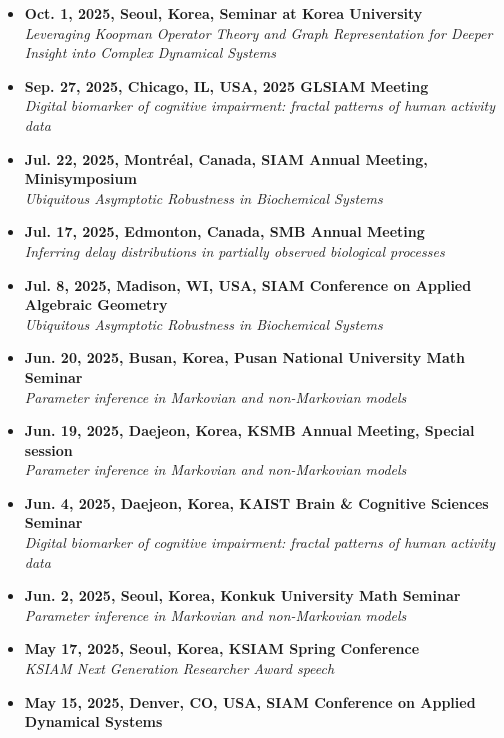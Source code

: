 \documentclass[margin,line]{res}
\begin{document}
\begin{resume}
\begin{itemize}[leftmargin=0pt, label={}]
    \textit{Ubiquitous Asymptotic Robustness in Biochemical Systems}
    \item \textbf{Oct. 1, 2025, Seoul, Korea, Seminar at Korea University} \\
    \textit{Leveraging Koopman Operator Theory and Graph Representation for Deeper Insight into Complex Dynamical Systems}
    \item \textbf{Sep. 27, 2025, Chicago, IL, USA, 2025 GLSIAM Meeting} \\
    \textit{Digital biomarker of cognitive impairment: fractal patterns of human activity data}
    \item \textbf{Jul. 22, 2025, Montréal, Canada, SIAM Annual Meeting, Minisymposium} \\
    \textit{Ubiquitous Asymptotic Robustness in Biochemical Systems}
    \item \textbf{Jul. 17, 2025, Edmonton, Canada, SMB Annual Meeting} \\
    \textit{Inferring delay distributions in partially observed biological processes}
    \item \textbf{Jul. 8, 2025, Madison, WI, USA, SIAM Conference on Applied Algebraic Geometry} \\
    \textit{Ubiquitous Asymptotic Robustness in Biochemical Systems}
    \item \textbf{Jun. 20, 2025, Busan, Korea, Pusan National University Math Seminar} \\
    \textit{Parameter inference in Markovian and non-Markovian models}
    \item \textbf{Jun. 19, 2025, Daejeon, Korea, KSMB Annual Meeting, Special session} \\
    \textit{Parameter inference in Markovian and non-Markovian models}
    \item \textbf{Jun. 4, 2025, Daejeon, Korea, KAIST Brain \& Cognitive Sciences Seminar} \\
    \textit{Digital biomarker of cognitive impairment: fractal patterns of human activity data}
    \item \textbf{Jun. 2, 2025, Seoul, Korea, Konkuk University Math Seminar} \\
    \textit{Parameter inference in Markovian and non-Markovian models}
    \item \textbf{May 17, 2025, Seoul, Korea, KSIAM Spring Conference} \\
    \textit{KSIAM Next Generation Researcher Award speech}
    \item \textbf{May 15, 2025, Denver, CO, USA, SIAM Conference on Applied Dynamical Systems} \\

\end{itemize}
\end{resume}
\end{document}
